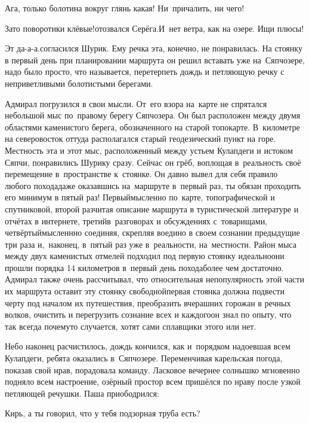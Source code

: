 \diagdash Ага, только болотина вокруг глянь какая! Ни~причалить, ни чего!

\diagdash Зато поворотики клёвые!\mdash отозвался Серёга.\mdash И~нет ветра, как на озере. Ищи плюсы!

\diagdash Эт да-а-а.\mdash согласился Шурик. Ему речка эта, конечно, не понравилась. На стоянку в первый день при планировании маршрута  он решил вставать уже на~Сяпчозере, надо было просто, что называется, перетерпеть дождь и петляющую речку с неприветливыми болотистыми берегами. 

Адмирал погрузился в свои мысли. От~его взора на~карте не спрятался небольшой мыс по~правому берегу Сяпчозера. Он был расположен между двумя областями каменистого берега, обозначенного на старой топокарте. В~километре на северо\sdash восток оттуда располагался старый геодезический пункт на горе. Местность эта и этот мыс, расположенный между устьем Кулапдеги и истоком Сяпчи, понравились Шурику сразу. Сейчас он грёб, воплощая в~реальность своё перемещение в~пространстве к~стоянке. Он давно вывел для себя правило любого похода\mdash даже оказавшись на~маршруте в~первый раз, ты обязан проходить его минимум в пятый раз! Первый\mdash мысленно по~карте, топографической и спутниковой, второй раз\mdash читая описание маршрута в туристической литературе и отчётах в интернете, третий\mdash в~разговорах и обсуждениях с~товарищами, четвёртый\mdash мысленнно соединяя, скрепляя воедино в своем сознании предыдущие три раза и,~наконец, в~пятый раз уже в~реальности, на~местности. Район мыса между двух каменистых отмелей подходил под первую стоянку идеально\mdash они прошли порядка 14 километров в~первый день похода\mdash более чем достаточно. Адмирал также очень рассчитывал, что относительная непопулярность этой части их маршрута оставит эту стоянку свободной\mdash первая стоянка должна подвести черту под началом их путешествия, преобразить вчерашних горожан в речных волков, очистить и перегрузить сознание всех и каждого\mdash он знал по опыту, что так всегда почему\sdash то случается, хотят сами сплавщики этого или нет. 

Небо наконец расчистилось, дождь кончился, как и~порядком надоевшая всем Кулапдеги, ребята оказались в~Сяпчозере. Переменчивая карельская погода, показав свой нрав, порадовала команду. Ласковое вечернее солнышко мгновенно подняло всем настроение, озёрный простор всем пришёлся по нраву после узкой петляющей речушки. Паша приободрился:

\diagdash Кирь, а ты говорил, что у тебя подзорная труба есть?

